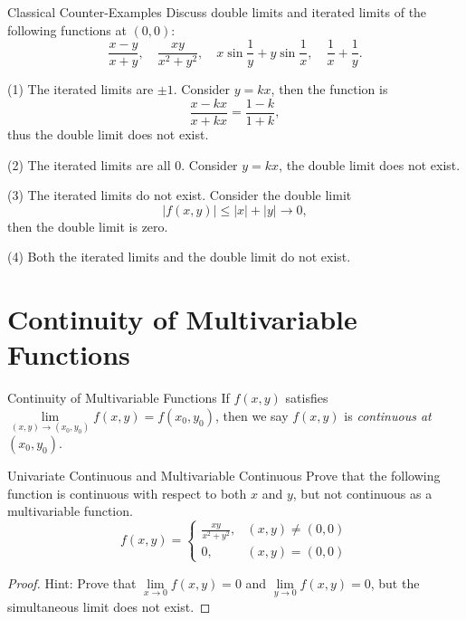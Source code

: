 \begin{example}{Classical Counter-Examples}{}
  Discuss double limits and iterated limits of the following functions at $(0, 0)$:
  \begin{equation}
    \frac{x - y}{x + y}, \quad
    \frac{xy}{x^2 + y^2}, \quad
    x \sin \frac{1}{y} + y \sin \frac{1}{x}, \quad
    \frac{1}{x} + \frac{1}{y}.
  \end{equation}
\end{example}

\begin{solution}
  (1) The iterated limits are $\pm 1$.
  Consider $y = kx$, then the function is
  \begin{equation}
    \frac{x - kx}{x + kx} = \frac{1 - k}{1 + k},
  \end{equation}
  thus the double limit does not exist.

  (2) The iterated limits are all $0$.
  Consider $y = kx$, the double limit does not exist.

  (3) The iterated limits do not exist.
  Consider the double limit
  \begin{equation}
    |f(x, y)| \leq |x| + |y| \rightarrow 0,
  \end{equation}
  then the double limit is zero.

  (4) Both the iterated limits and the double limit do not exist.
\end{solution}

\section{Continuity of Multivariable Functions}

\begin{definition}{Continuity of Multivariable Functions}{}
  If $f(x, y)$ satisfies $\lim \limits _{(x,y)\rightarrow (x_0, y_0)} f(x,y) =
  f(x_0, y_0)$,
  then we say $f(x,y)$ is \emph{continuous at $(x_0, y_0)$}.
\end{definition}

\begin{example}{Univariate Continuous and Multivariable Continuous}{}
  Prove that the following function is continuous with respect to both $x$ and
  $y$,
  but not continuous as a multivariable function.
  \begin{equation}
    f(x,y)=\begin{cases}
      \frac{xy}{x^2+y^2},&(x,y)\neq(0,0)\\
      0,&(x,y)=(0,0)
    \end{cases}
  \end{equation}
\end{example}

\begin{proof}
  Hint: Prove that $\lim \limits _{x \rightarrow 0} f(x,y) = 0$ and $\lim
  \limits _{y \rightarrow 0} f(x,y) = 0$,
  but the simultaneous limit does not exist.
\end{proof}

